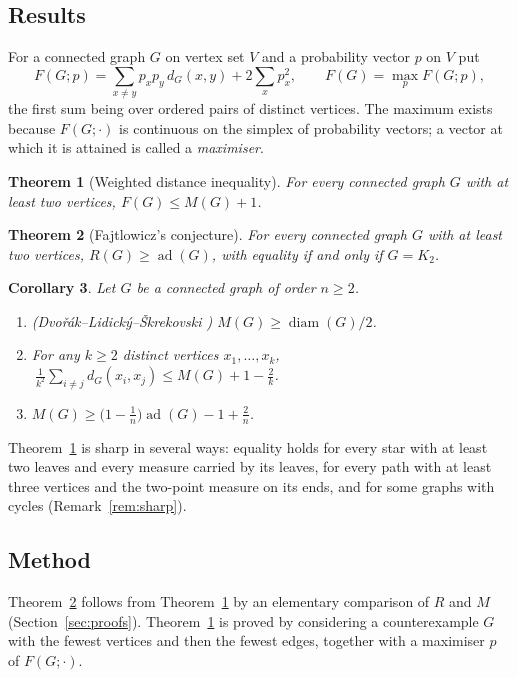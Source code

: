 \documentclass[11pt,a4paper]{article}
\newtheorem{theorem}{Theorem}[section]
\newtheorem{corollary}[theorem]{Corollary}
\theoremstyle{definition}
\theoremstyle{remark}
\numberwithin{equation}{section}
\newcommand{\ad}{\operatorname{ad}}
\newcommand{\diam}{\operatorname{diam}}
\begin{document}
\subsection{Results}
For a connected graph $G$ on vertex set $V$ and a probability vector $p$ on $V$
put
\begin{equation}\label{eq:F}
 F(G;p)=\sum_{x\ne y}p_xp_y\,d_G(x,y)+2\sum_{x}p_x^2,\qquad F(G)=\max_pF(G;p),
\end{equation}
the first sum being over ordered pairs of distinct vertices. The maximum exists
because $F(G;\cdot)$ is continuous on the simplex of probability vectors; a vector
at which it is attained is called a \emph{maximiser}.

\begin{theorem}[Weighted distance inequality]\label{thm:W}
For every connected graph $G$ with at least two vertices, $F(G)\le M(G)+1$.
\end{theorem}

\begin{theorem}[Fajtlowicz's conjecture]\label{thm:F}
For every connected graph $G$ with at least two vertices, $R(G)\ge\ad(G)$, with
equality if and only if $G=K_2$.
\end{theorem}

\begin{corollary}\label{cor:main}
Let $G$ be a connected graph of order $n\ge2$.
\begin{enumerate}[label=(\alph*)]
\item {\rm (Dvo\v{r}\'ak--Lidick\'y--\v{S}krekovski \cite{DLS})} $M(G)\ge\diam(G)/2$.
\item For any $k\ge2$ distinct vertices $x_1,\dots,x_k$,
$\ \frac1{k^2}\sum_{i\ne j}d_G(x_i,x_j)\le M(G)+1-\frac2k$.
\item $M(G)\ge\bigl(1-\frac1n\bigr)\ad(G)-1+\frac2n$.
\end{enumerate}
\end{corollary}

Theorem~\ref{thm:W} is sharp in several ways: equality holds for every star with
at least two leaves and every measure carried by its leaves, for every path with at
least three vertices and the two-point measure on its ends, and for some graphs
with cycles (Remark~\ref{rem:sharp}).

\subsection{Method}
Theorem~\ref{thm:F} follows from Theorem~\ref{thm:W} by an elementary comparison of
$R$ and $M$ (Section~\ref{sec:proofs}). Theorem~\ref{thm:W} is proved by considering a
counterexample $G$ with the fewest vertices and then the fewest edges, together
with a maximiser $p$ of $F(G;\cdot)$.
\end{document}
